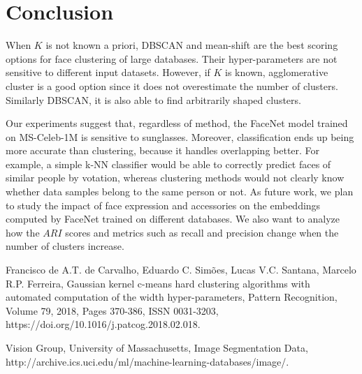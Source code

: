 \documentclass[conference]{IEEEtran}
\begin{document}
\section{Conclusion}

When $K$ is not known a priori, DBSCAN and mean-shift are the best scoring options for face clustering of large databases.
Their hyper-parameters are not sensitive to different input datasets.
However, if $K$ is known, agglomerative cluster is a good option since it does not overestimate the number of clusters.
Similarly DBSCAN, it is also able to find arbitrarily shaped clusters.

Our experiments suggest that, regardless of method, the FaceNet model trained on MS-Celeb-1M is sensitive to sunglasses.
Moreover, classification ends up being more accurate than clustering, because it handles overlapping better.
For example, a simple k-NN classifier would be able to correctly predict faces of similar people by votation, whereas clustering methods would not clearly know whether data samples belong to the same person or not.
As future work, we plan to study the impact of face expression and accessories on the embeddings computed by FaceNet trained on different databases.
We also want to analyze how the $ARI$ scores and metrics such as recall and precision change when the number of clusters increase.

\begin{thebibliography}{00}
 Francisco de A.T. de Carvalho, Eduardo C. Simões, Lucas V.C. Santana, Marcelo R.P. Ferreira,
Gaussian kernel c-means hard clustering algorithms with automated computation of the width hyper-parameters,
Pattern Recognition,
Volume 79,
2018,
Pages 370-386,
ISSN 0031-3203,
https://doi.org/10.1016/j.patcog.2018.02.018.

 Vision Group, University of Massachusetts, 
Image Segmentation Data,
http://archive.ics.uci.edu/ml/machine-learning-databases/image/.

\end{thebibliography}
\end{document}
